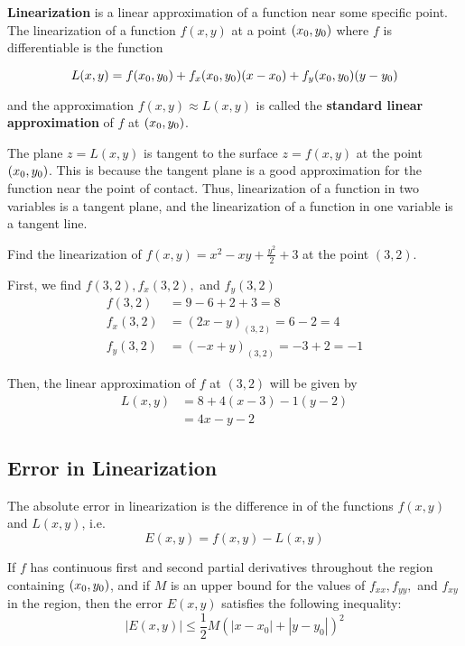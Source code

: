 \textbf{Linearization} is a linear approximation of a function near some specific point. The linearization of a function
$f(x, y)$ at a point $(x_0, y_0)$ where $f$ is differentiable is the function

\begin{equation}
    L(x, y) = f(x_0, y_0) + f_x (x_0, y_0) (x - x_0) + f_y (x_0, y_0) (y - y_0)
\end{equation}

and the approximation $f(x, y) \approx L(x, y)$ is called the \textbf{standard linear approximation} of $f$ at $(x_0, y_0)$.

The plane $z = L(x, y)$ is tangent to the surface $z = f(x, y)$ at the point $(x_0, y_0)$. This is because the tangent plane is a
good approximation for the function near the point of contact. Thus, linearization of a function in two variables is a tangent
plane, and the linearization of a function in one variable is a tangent line.

\begin{example}
    \normalfont Find the linearization of $f(x, y) = x^2 - xy + \frac{y^2}{2} + 3$ at the point $(3, 2)$.

    First, we find $f(3, 2), f_x(3, 2), $ and $f_y(3, 2)$
    \begin{align*}
        f(3, 2) &= 9 - 6 + 2 + 3 = 8 \\
        f_x(3, 2) &= (2x - y)_{(3, 2)} = 6 - 2 = 4 \\
        f_y(3, 2) &= (-x + y)_{(3, 2)} = -3 + 2 = -1
    \end{align*}

    Then, the linear approximation of $f$ at $(3, 2)$ will be given by
    \begin{align*}
        L(x, y) &= 8 + 4(x - 3) - 1(y - 2) \\
        &= 4x - y - 2
    \end{align*}
\end{example}


\subsection{Error in Linearization}

The absolute error in linearization is the difference in of the functions $f(x, y)$ and $L(x, y)$, i.e.
\begin{equation}
    E(x, y) = f(x, y) - L(x, y)
\end{equation}

If $f$ has continuous first and second partial derivatives throughout the region containing $(x_0, y_0)$, and if $M$ is an
upper bound for the values of $f_{xx}, f_{yy},$ and $f_{xy}$ in the region, then the error $E(x, y)$ satisfies the
following inequality:
\begin{equation}
    |E(x, y)| \leq \frac{1}{2} M (|x - x_0| + |y - y_0|)^2
\end{equation}

